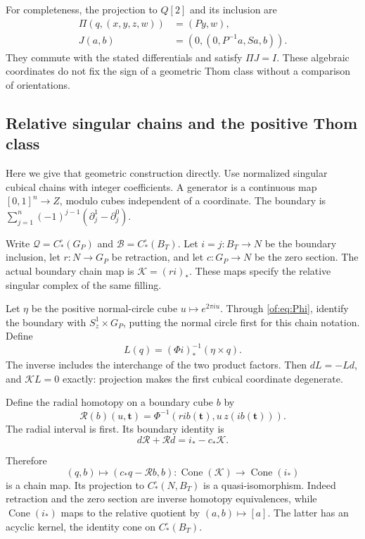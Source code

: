 For completeness, the projection to $Q[2]$ and its inclusion are
\begin{equation}\label{of:eq:relative-maps}
 \begin{split}
 \Pi(q,(x,y,z,w))&=(Py,w),\\
 J(a,b)&=(0,(0,P^{-1}a,Sa,b)).
 \end{split}
\end{equation}
They commute with the stated differentials and satisfy $\Pi J=I$.
These algebraic coordinates do not fix the sign of a geometric Thom class
without a comparison of orientations.

\subsection{Relative singular chains and the positive Thom class}

Here we give that geometric construction directly.
Use normalized singular cubical chains with integer coefficients.
A generator is a continuous map $[0,1]^n\to Z$, modulo cubes independent
of a coordinate. The boundary is
$\sum_{j=1}^n(-1)^{j-1}(\partial_j^1-\partial_j^0)$.

Write $\mathscr Q=C_*^\square(G_P)$ and
$\mathscr B=C_*^\square(B_T)$.
Let $i=j:B_T\to N$ be the boundary inclusion, let $r:N\to G_P$ be
retraction, and let $c:G_P\to N$ be the zero section.
The actual boundary chain map is $\mathscr K=(ri)_*$.
These maps specify the relative singular complex of the same filling.

Let $\eta$ be the positive normal-circle cube
$u\mapsto e^{2\pi iu}$.
Through \eqref{of:eq:Phi}, identify the boundary with $S^1_z\times G_P$,
putting the normal circle first for this chain notation.
Define
\begin{equation}\label{of:eq:L}
 L(q)=(\Phi i)^{-1}_*(\eta\times q).
\end{equation}
The inverse includes the interchange of the two product factors.
Then $dL=-Ld$, and $\mathscr K L=0$ exactly: projection makes the first
cubical coordinate degenerate.

Define the radial homotopy on a boundary cube $b$ by
\[
 \mathcal R(b)(u,\mathbf t)
   =\Phi^{-1}(r i b(\mathbf t),u\,z(i b(\mathbf t))).
\]
The radial interval is first. Its boundary identity is
\begin{equation}\label{of:eq:radial}
                 d\mathcal R+\mathcal R d=i_*-c_*\mathscr K.
\end{equation}

Therefore
\begin{equation}\label{of:eq:cone-comparison}
 (q,b)\longmapsto(c_*q-\mathcal R b,b)
 \colon\operatorname{Cone}(\mathscr K)\longrightarrow
                         \operatorname{Cone}(i_*)
\end{equation}
is a chain map. Its projection to $C_*^\square(N,B_T)$ is a
quasi-isomorphism. Indeed retraction and the zero section are inverse
homotopy equivalences, while $\operatorname{Cone}(i_*)$ maps to the
relative quotient by $(a,b)\mapsto[a]$. The latter has an acyclic kernel,
the identity cone on $C_*^\square(B_T)$.

